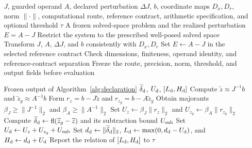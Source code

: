 \begin{algorithm}[H]
\caption{Coordinate and reference-problem declaration}
\label{alg:declaration}
\begin{algorithmic}[1]
\Require $J$, guarded operand $A$, declared perturbation $\Delta J$, $b$,
coordinate maps $D_x,D_r$, norm $\lVert\cdot\rVert$, computational route,
reference contract, arithmetic specification, and optional threshold $\tau$
\Ensure A frozen solved-space problem and the realized perturbation $E=A-J$
\State Restrict the system to the prescribed well-posed solved space
\State Transform $J$, $A$, $\Delta J$, and $b$ consistently with $D_x,D_r$
\State Set $E\gets A-J$ in the selected reference contract
\State Check dimensions, finiteness, operand identity, and reference-contract separation
\State Freeze the route, precision, norm, threshold, and output fields before evaluation
\end{algorithmic}
\end{algorithm}

\begin{algorithm}[H]
\caption{Direct-difference finite-precision error enclosure}
\label{alg:direct}
\begin{algorithmic}[1]
\Require Frozen output of Algorithm~\ref{alg:declaration}
\Ensure $\widetilde\delta_{\rm d}$, $U_{\rm d}$, $[L_{\rm d},H_{\rm d}]$
\State Compute $\widetilde z\approx J^{-1}b$ and
$\widetilde z_g\approx A^{-1}b$
\State Form $r_z=b-J\widetilde z$ and
$r_{z_g}=b-A\widetilde z_g$
\State Obtain majorants $\beta_J\geq\lVert J^{-1}\rVert_2$ and
$\beta_A\geq\lVert A^{-1}\rVert_2$
\State Set $U_z\gets\beta_J\lVert r_z\rVert_2$ and
$U_{z_g}\gets\beta_A\lVert r_{z_g}\rVert_2$
\State Compute $\widetilde\delta_{\rm d}\gets
\operatorname{fl}(\widetilde z_g-\widetilde z)$ and its subtraction bound
$U_{\rm sub}$
\State Set $U_{\rm d}\gets U_z+U_{z_g}+U_{\rm sub}$
\State Set $d_{\rm d}\gets\lVert\widetilde\delta_{\rm d}\rVert_2$,
$L_{\rm d}\gets\max(0,d_{\rm d}-U_{\rm d})$, and
$H_{\rm d}\gets d_{\rm d}+U_{\rm d}$
\State Report the relation of $[L_{\rm d},H_{\rm d}]$ to $\tau$
\end{algorithmic}
\end{algorithm}

